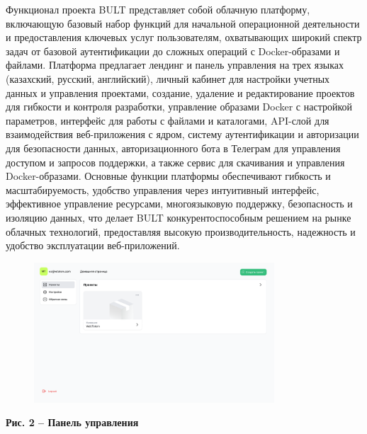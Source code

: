 {Функционал проекта BULT представляет собой облачную платформу,
включающую базовый набор функций для начальной операционной деятельности
и предоставления ключевых услуг пользователям, охватывающих широкий
спектр задач от базовой аутентификации до сложных операций с
Docker-образами и файлами. Платформа предлагает лендинг и панель
управления на трех языках (казахский, русский, английский), личный
кабинет для настройки учетных данных и управления проектами, создание,
удаление и редактирование проектов для гибкости и контроля разработки,
управление образами Docker с настройкой параметров, интерфейс для работы
с файлами и каталогами, API-слой для взаимодействия веб-приложения с
ядром, систему аутентификации и авторизации для безопасности данных,
авторизационного бота в Телеграм для управления доступом и запросов
поддержки, а также сервис для скачивания и управления Docker-образами.
Основные функции платформы обеспечивают гибкость и масштабируемость,
удобство управления через интуитивный интерфейс, эффективное управление
ресурсами, многоязыковую поддержку, безопасность и изоляцию данных, что
делает BULT конкурентоспособным решением на рынке облачных технологий,
предоставляя высокую производительность, надежность и удобство
эксплуатации веб-приложений.

\begin{figure}[H]
	\centering
	\includegraphics[width=0.8\textwidth]{media/ict/image19}
	\caption*{}
\end{figure}


{\bfseries Рис. 2 -- Панель управления}

}
